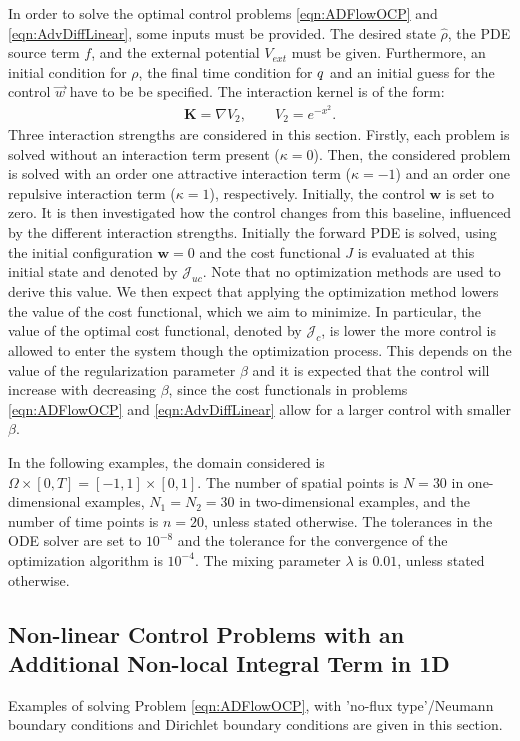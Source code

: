 
In order to solve the optimal control problems \eqref{eqn:ADFlowOCP} and \eqref{eqn:AdvDiffLinear}, some inputs must be provided. The desired state $\widehat \rho$, the PDE source term $f$, and the external potential $V_{ext}$ must be given. Furthermore, an initial condition for $\rho$, the final time condition for $q$ and an initial guess for the control $\vec{w}$ have to be be specified. 
The interaction kernel is of the form:
\begin{align*}
\mathbf{K} = \nabla V_2, \qquad V_2 = e^{-x^2}.
\end{align*}
Three interaction strengths are considered in this section. Firstly, each problem is solved without an interaction term present ($\kappa = 0$). Then, the considered problem is solved with an order one attractive interaction term ($\kappa = -1$) and an order one repulsive interaction term ($\kappa = 1$), respectively. Initially, the control $\mathbf{w}$ is set to zero. It is then investigated how the control changes from this baseline, influenced by the different interaction strengths. 
Initially the forward PDE is solved, using the initial configuration $\mathbf{w}=0$ and the cost functional $J$ is evaluated at this initial state and denoted by $\mathcal{J}_{uc}$. Note that no optimization methods are used to derive this value. We then expect that applying the optimization method lowers the value of the cost functional, which we aim to minimize. 
In particular, the value of the optimal cost functional, denoted by $\mathcal{J}_c$, is lower the more control is allowed to enter the system though the optimization process. 
This depends on the value of the regularization parameter $\beta$ and it is expected that the control will increase with decreasing $\beta$, since the cost functionals in problems \eqref{eqn:ADFlowOCP} and \eqref{eqn:AdvDiffLinear} allow for a larger control with smaller $\beta$. 

In the following examples, the domain considered is $\Omega \times [0,T] = [-1,1] \times [0,1]$. The number of spatial points is $N=30$ in one-dimensional examples, $N_1 = N_2 = 30$ in two-dimensional examples, and the number of time points is $n=20$, unless stated otherwise. The tolerances in the ODE solver are set to $10^{-8}$ and the tolerance for the convergence of the optimization algorithm is $10^{-4}$. The mixing parameter $\lambda$ is $0.01$, unless stated otherwise.
\subsection{Non-linear Control Problems with an Additional Non-local Integral Term in 1D} \label{sec:Examples1d}
Examples of solving Problem \eqref{eqn:ADFlowOCP}, with 'no-flux type'/Neumann boundary conditions and Dirichlet boundary conditions are given in this section. 
 
